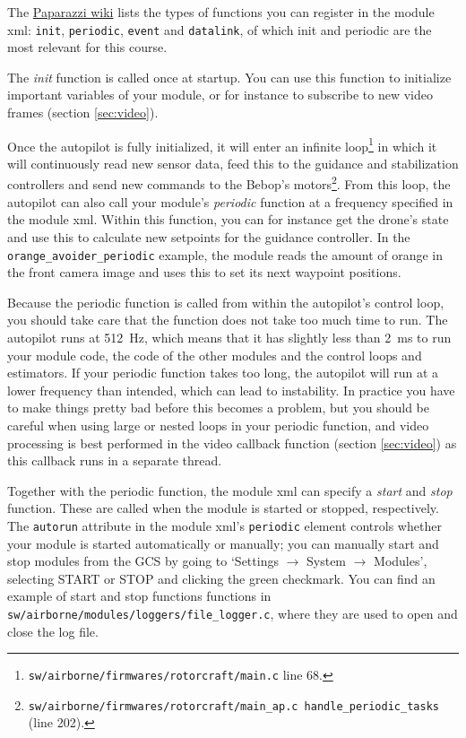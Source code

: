 \documentclass{article}
\begin{document}
The \href{https://wiki.paparazziuav.org/wiki/Modules}{Paparazzi wiki} lists the types of functions you can register in the module xml: \texttt{init}, \texttt{periodic}, \texttt{event} and \texttt{datalink}, of which init and periodic are the most relevant for this course.

The \emph{init} function is called once at startup. You can use this function to initialize important variables of your module, or for instance to subscribe to new video frames (section \ref{sec:video}).

Once the autopilot is fully initialized, it will enter an infinite loop\footnote{\texttt{sw/airborne/firmwares/rotorcraft/main.c} line 68.} in which it will continuously read new sensor data, feed this to the guidance and stabilization controllers and send new commands to the Bebop's motors\footnote{\texttt{sw/airborne/firmwares/rotorcraft/main\_ap.c handle\_periodic\_tasks} (line 202).}.
From this loop, the autopilot can also call your module's \emph{periodic} function at a frequency specified in the module xml. Within this function, you can for instance get the drone's state and use this to calculate new setpoints for the guidance controller. In the \texttt{orange\_avoider\_periodic} example, the module reads the amount of orange in the front camera image and uses this to set its next waypoint positions.

Because the periodic function is called from within the autopilot's control loop, you should take care that the function does not take too much time to run. The autopilot runs at 512~Hz, which means that it has slightly less than 2~ms to run your module code, the code of the other modules and the control loops and estimators. If your periodic function takes too long, the autopilot will run at a lower frequency than intended, which can lead to instability. In practice you have to make things pretty bad before this becomes a problem, but you should be careful when using large or nested loops in your periodic function, and video processing is best performed in the video callback function (section \ref{sec:video}) as this callback runs in a separate thread.

Together with the periodic function, the module xml can specify a \emph{start} and \emph{stop} function. These are called when the module is started or stopped, respectively. The \texttt{autorun} attribute in the module xml's \texttt{periodic} element controls whether your module is started automatically or manually; you can manually start and stop modules from the GCS by going to `Settings $\rightarrow$ System $\rightarrow$ Modules', selecting START or STOP and clicking the green checkmark.
You can find an example of start and stop functions functions in \texttt{sw/airborne/modules/loggers/file\_logger.c}, where they are used to open and close the log file.
\end{document}
